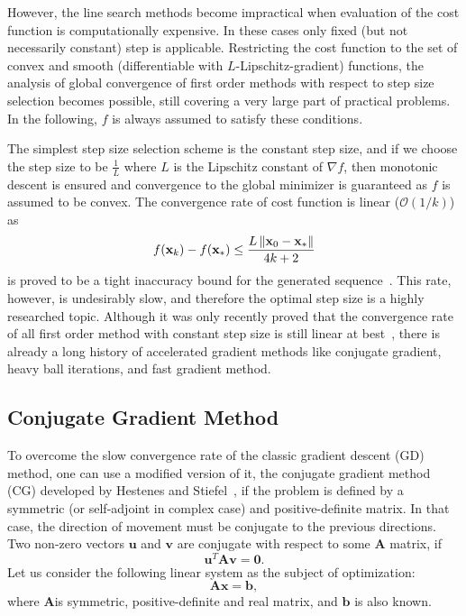 However, the line search methods become impractical when evaluation of the cost function is computationally expensive. In these cases only fixed (but not necessarily constant) step is applicable. Restricting the cost function to the set of convex and smooth (differentiable with $L$-Lipschitz-gradient) functions, the analysis of global convergence of first order methods with respect to step size selection becomes possible, still covering a very large part of practical problems. In the following, $f$ is always assumed to satisfy these conditions.

The simplest step size selection scheme is the constant step size, and if we choose the step size to be $\frac{1}{L}$ where $L$ is the Lipschitz constant of $\nabla f$, then monotonic descent is ensured and convergence to the global minimizer is guaranteed  as $f$ is assumed to be convex. The convergence rate of cost function is linear ($\mathcal{O}(1/k)$) as 
\[f(\mathbf{x}_k) - f(\mathbf{x}_*) \le \frac{L\left\lVert\mathbf{x}_0 - \mathbf{x}_*\right\rVert}{4k + 2}\]
is proved to be a tight inaccuracy bound for the generated sequence~\cite{drori_performance_2014}. This rate, however, is undesirably slow, and therefore the optimal step size is a highly researched topic. Although it was only recently proved that the convergence rate of all first order method with constant step size is still linear at best~\cite{taylor_smooth_2017}, there is already a long history of accelerated gradient methods like conjugate gradient, heavy ball iterations, and fast gradient method.

\subsection{Conjugate Gradient Method}

To overcome the slow convergence rate of the classic gradient descent (GD) method, one can use a modified version of it, the conjugate gradient method (CG) developed by Hestenes and Stiefel~\cite{hestenes_methods_1952}, if the problem is defined by a symmetric (or self-adjoint in complex case) and positive-definite matrix. In that case, the direction of movement must be conjugate to the previous directions. Two non-zero vectors $\mathbf{u}$ and $\mathbf{v}$ are conjugate with respect to some $\mathbf{A}$ matrix, if \[\mathbf{u}^T\mathbf{Av} = \mathbf{0}.\]
Let us consider the following linear system as the subject of optimization:
\[\mathbf{Ax} = \mathbf{b},\]
where $\mathbf{A} $is symmetric, positive-definite and real matrix, and $\mathbf{b}$ is also known.

